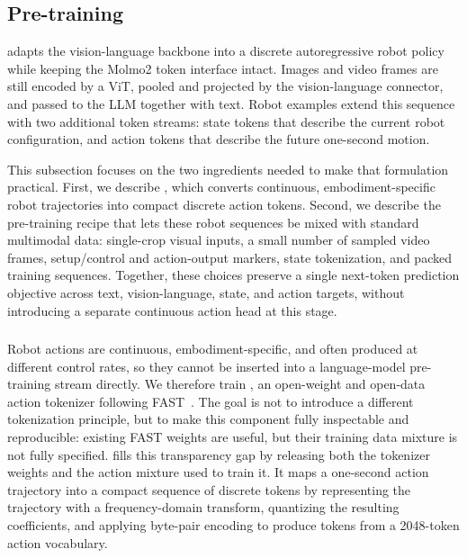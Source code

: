 \subsection{Pre-training}
\label{sec:pretraining}

\molmoacttpre adapts the \molmoer vision-language backbone into a discrete autoregressive robot policy while keeping the Molmo2 token interface intact. Images and video frames are still encoded by a ViT, pooled and projected by the vision-language connector, and passed to the LLM together with text. Robot examples extend this sequence with two additional token streams: state tokens that describe the current robot configuration, and action tokens that describe the future one-second motion.

This subsection focuses on the two ingredients needed to make that formulation practical. First, we describe \molmoactfast, which converts continuous, embodiment-specific robot trajectories into compact discrete action tokens. Second, we describe the pre-training recipe that lets these robot sequences be mixed with standard multimodal data: single-crop visual inputs, a small number of sampled video frames, setup/control and action-output markers, state tokenization, and packed training sequences. Together, these choices preserve a single next-token prediction objective across text, vision-language, state, and action targets, without introducing a separate continuous action head at this stage.

\subsubsection{\molmoactfast}
\label{sec:openfast}

Robot actions are continuous, embodiment-specific, and often produced at different control rates, so they cannot be inserted into a language-model pre-training stream directly. We therefore train \molmoactfast, an open-weight and open-data action tokenizer following FAST~\citep{pertsch2025fast}. The goal is not to introduce a different tokenization principle, but to make this component fully inspectable and reproducible: existing FAST weights are useful, but their training data mixture is not fully specified. \molmoactfast fills this transparency gap by releasing both the tokenizer weights and the action mixture used to train it. It maps a one-second action trajectory into a compact sequence of discrete tokens by representing the trajectory with a frequency-domain transform, quantizing the resulting coefficients, and applying byte-pair encoding to produce tokens from a 2048-token action vocabulary.

